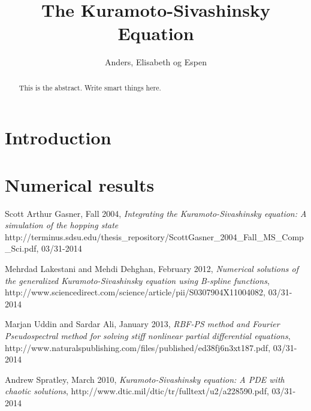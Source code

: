 \documentclass[10pt,a4paper]{article}
\begin{document}
\title{The Kuramoto-Sivashinsky Equation}
\author{Anders, Elisabeth og Espen}

\maketitle



\begin{abstract}
This is the abstract. Write smart things here.
\end{abstract}



\section*{Introduction}


\section*{Numerical results}






\begin{thebibliography}{9}

Scott Arthur Gasner, Fall 2004,
\emph{Integrating the Kuramoto-Sivashinsky equation: A simulation of the hopping state}
http://terminus.sdsu.edu/thesis\_repository/ScottGasner\_2004\_Fall\_MS\_Comp\_Sci.pdf, 03/31-2014

Mehrdad Lakestani and Mehdi Dehghan, February 2012,
\emph{Numerical solutions of the generalized Kuramoto-Sivashinsky equation using B-spline functions},
http://www.sciencedirect.com/science/article/pii/S0307904X11004082, 03/31-2014

Marjan Uddin and Sardar Ali, January 2013,
\emph{RBF-PS method and Fourier Pseudospectral method for solving stiff 
nonlinear partial differential equations},
http://www.naturalspublishing.com/files/published/ed38fj6n3xt187.pdf, 03/31-2014

Andrew Spratley, March 2010,
\emph{Kuramoto-Sivashinsky equation: A PDE with chaotic solutions},
http://www.dtic.mil/dtic/tr/fulltext/u2/a228590.pdf, 03/31-2014

\end{thebibliography}
\end{document}
